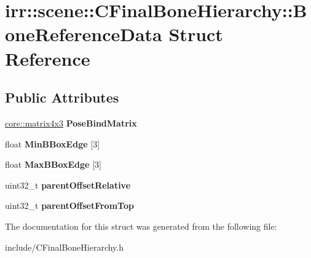 \hypertarget{structirr_1_1scene_1_1CFinalBoneHierarchy_1_1BoneReferenceData}{}\section{irr\+:\+:scene\+:\+:C\+Final\+Bone\+Hierarchy\+:\+:Bone\+Reference\+Data Struct Reference}
\label{structirr_1_1scene_1_1CFinalBoneHierarchy_1_1BoneReferenceData}
\subsection*{Public Attributes}
\begin{DoxyCompactItemize}
\item 
\hyperlink{classirr_1_1core_1_1matrix4x3}{core\+::matrix4x3} {\bfseries Pose\+Bind\+Matrix}\hypertarget{structirr_1_1scene_1_1CFinalBoneHierarchy_1_1BoneReferenceData_a6f82559cee3ba93dd55fab5a32fd4233}{}\label{structirr_1_1scene_1_1CFinalBoneHierarchy_1_1BoneReferenceData_a6f82559cee3ba93dd55fab5a32fd4233}

\item 
float {\bfseries Min\+B\+Box\+Edge} \mbox{[}3\mbox{]}\hypertarget{structirr_1_1scene_1_1CFinalBoneHierarchy_1_1BoneReferenceData_a934ce36581478c4e7c59fcd8c0725662}{}\label{structirr_1_1scene_1_1CFinalBoneHierarchy_1_1BoneReferenceData_a934ce36581478c4e7c59fcd8c0725662}

\item 
float {\bfseries Max\+B\+Box\+Edge} \mbox{[}3\mbox{]}\hypertarget{structirr_1_1scene_1_1CFinalBoneHierarchy_1_1BoneReferenceData_a6f929eec794842d7d9102ad86483cdb0}{}\label{structirr_1_1scene_1_1CFinalBoneHierarchy_1_1BoneReferenceData_a6f929eec794842d7d9102ad86483cdb0}

\item 
uint32\+\_\+t {\bfseries parent\+Offset\+Relative}\hypertarget{structirr_1_1scene_1_1CFinalBoneHierarchy_1_1BoneReferenceData_a721ee5494a4f4e81477d3c9d5052375f}{}\label{structirr_1_1scene_1_1CFinalBoneHierarchy_1_1BoneReferenceData_a721ee5494a4f4e81477d3c9d5052375f}

\item 
uint32\+\_\+t {\bfseries parent\+Offset\+From\+Top}\hypertarget{structirr_1_1scene_1_1CFinalBoneHierarchy_1_1BoneReferenceData_a3e1a6d0002331120101294f62a3e5a02}{}\label{structirr_1_1scene_1_1CFinalBoneHierarchy_1_1BoneReferenceData_a3e1a6d0002331120101294f62a3e5a02}

\end{DoxyCompactItemize}


The documentation for this struct was generated from the following file\+:\begin{DoxyCompactItemize}
\item 
include/C\+Final\+Bone\+Hierarchy.\+h\end{DoxyCompactItemize}
